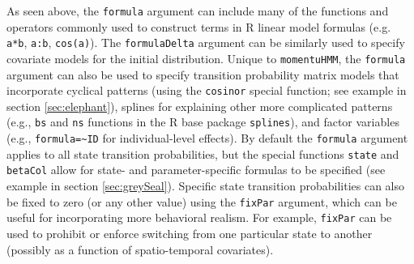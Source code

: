 \documentclass[12pt]{article}\usepackage[]{graphicx}\usepackage[]{color}
\begin{document}
As seen above, the \verb|formula| argument can include many of the functions and operators commonly used to construct terms in R linear model formulas (e.g. \verb|a*b|, \verb|a:b|, \verb|cos(a)|). The \verb|formulaDelta| argument can be similarly used to specify covariate models for the initial distribution.  Unique to \verb|momentuHMM|, the \verb|formula| argument can also be used to specify transition probability matrix models that incorporate cyclical patterns (using the \verb|cosinor| special function; see example in section \ref{sec:elephant}), splines for explaining other more complicated patterns (e.g., \verb|bs| and \verb|ns| functions in the R base package \verb|splines|), and factor variables (e.g., \verb|formula=~ID| for individual-level effects).  By default the \verb|formula| argument applies to all state transition probabilities, but the special functions \verb|state| and \verb|betaCol| allow for state- and parameter-specific formulas to be specified (see example in section \ref{sec:greySeal}). Specific state transition probabilities can also be fixed to zero (or any other value) using the \verb|fixPar| argument, which can be useful for incorporating more behavioral realism.  For example, \verb|fixPar| can be used to prohibit or enforce switching from one particular state to another (possibly as a function of spatio-temporal covariates). 
\end{document}
